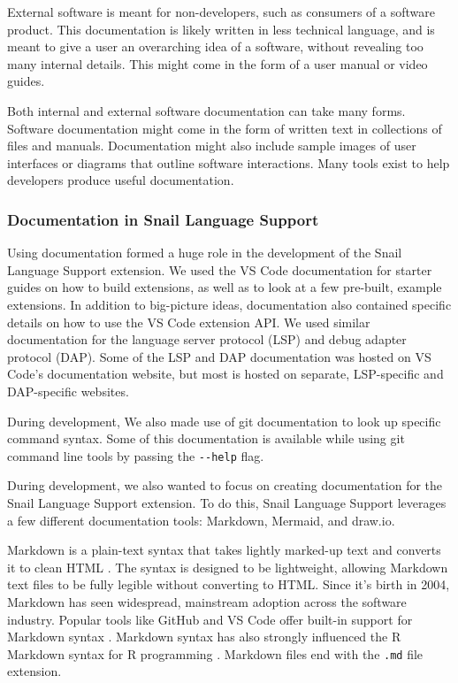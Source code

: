 \documentclass{article}
\begin{document}
External software is meant for non-developers, such as consumers of a software product. This documentation is likely written in less technical language, and is meant to give a user an overarching idea of a software, without revealing too many internal details. This might come in the form of a user manual or video guides.

Both internal and external software documentation can take many forms. Software documentation might come in the form of written text in collections of files and manuals. Documentation might also include sample images of user interfaces or diagrams that outline software interactions. Many tools exist to help developers produce useful documentation.

\subsubsection{Documentation in Snail Language Support}

Using documentation formed a huge role in the development of the Snail Language Support extension. We used the VS Code documentation for starter guides on how to build extensions, as well as to look at a few pre-built, example extensions. In addition to big-picture ideas, documentation also contained specific details on how to use the VS Code extension API. We used similar documentation for the language server protocol (LSP) and debug adapter protocol (DAP). Some of the LSP and DAP documentation was hosted on VS Code's documentation website, but most is hosted on separate, LSP-specific and DAP-specific websites. 

During development, We also made use of git documentation to look up specific command syntax. Some of this documentation is available while using git command line tools by passing the \lstinline{--help} flag.

During development, we also wanted to focus on creating documentation for the Snail Language Support extension. To do this, Snail Language Support leverages a few different documentation tools: Markdown, Mermaid, and draw.io. 

Markdown is a plain-text syntax that takes lightly marked-up text and converts it to clean HTML \cite{Gruber_2004}. The syntax is designed to be lightweight, allowing Markdown text files to be fully legible without converting to HTML. Since it's birth in 2004, Markdown has seen widespread, mainstream adoption across the software industry. Popular tools like GitHub and VS Code offer built-in support for Markdown syntax \cite{GitHub_2023, Microsoft_2023k}. Markdown syntax has also strongly influenced the R Markdown syntax for R programming \cite{RStudio_2020}. Markdown files end with the \lstinline{.md} file extension. 
\end{document}
